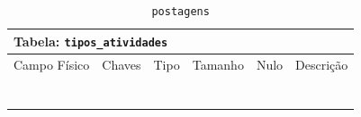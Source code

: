 \documentclass[12pt,a4paper]{article}
\begin{document}
\begin{center}
\begin{table}[h!]
	\caption{\texttt{postagens}}
	\label{tabela:postagens}
	\begin{tabular}{|p{2.5cm}|p{1cm}|p{1.25cm}|p{1.75cm}|p{1.25cm}|p{5cm}|}\hline	
		\multicolumn{6}{|p{16cm}|}{\cellcolor{cinzaClaro}  \centering Tabela: \texttt{tipos\_atividades}} \\ \hline %
		{\small Campo Físico}   & {\small Chaves} & {\small Tipo} & {\small Tamanho} & {\small Nulo} & {\small Descrição}\\\hline %
		
		{\tiny } & {\tiny } & {\tiny } & {\tiny } & {\tiny } &{\tiny }\\\hline
		{\tiny } & {\tiny } & {\tiny } & {\tiny } & {\tiny } &{\tiny }\\\hline
		{\tiny } & {\tiny } & {\tiny } & {\tiny } & {\tiny } &{\tiny }\\\hline
		{\tiny } & {\tiny } & {\tiny } & {\tiny } & {\tiny } &{\tiny }\\\hline
		{\tiny } & {\tiny } & {\tiny } & {\tiny } & {\tiny } &{\tiny }\\\hline
		{\tiny } & {\tiny } & {\tiny } & {\tiny } & {\tiny } &{\tiny }\\\hline
		{\tiny } & {\tiny } & {\tiny } & {\tiny } & {\tiny } &{\tiny }\\\hline
		
			
	\end{tabular}
\end{table}	
\end{center}
\end{document}
